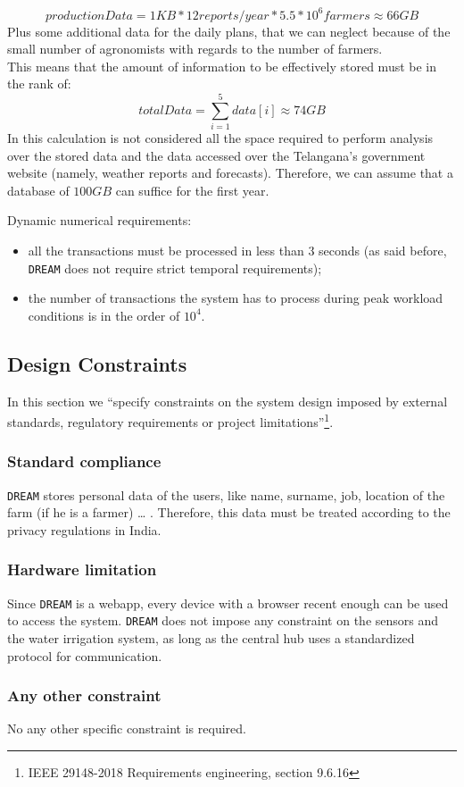 \documentclass{article}
\begin{document}
\begin{itemize}
\[productionData = 1 KB * 12 reports/year * 5.5 * 10^6 farmers \approx 66 GB \]
Plus some additional data for the daily plans, that we can neglect because of the small number of agronomists with regards to the number of farmers.\\
This means that the amount of information to be effectively stored must be in the rank of:
\[totalData = \sum_{i=1}^{5} data[i] \approx 74 GB \]
In this calculation is not considered all the space required to perform analysis over the stored data and the data accessed over the Telangana's government website (namely, weather reports and forecasts). Therefore, we can assume that a database of $100 GB$ can suffice for the first year.
\end{itemize}
Dynamic numerical requirements:
\begin{itemize}
\item all the transactions must be processed in less than 3 seconds (as said before, \verb|DREAM| does not require strict temporal requirements);
\item the number of transactions the system has to process during peak workload conditions is in the order of $10^4$.
\end{itemize}

\subsection{Design Constraints}
In this section we “specify constraints on the system design imposed by external standards, regulatory requirements or project limitations”\footnote{IEEE 29148-2018 Requirements engineering, section 9.6.16}.
\subsubsection{Standard compliance}
\verb|DREAM| stores personal data of the users, like name, surname, job, location of the farm (if he is a farmer) … . Therefore, this data must be treated according to the privacy regulations in India.
\subsubsection{Hardware limitation}
Since \verb|DREAM| is a webapp, every device with a browser recent enough can be used to access the system. \verb|DREAM| does not impose any constraint on the sensors and the water irrigation system, as long as the central hub uses a standardized protocol for communication.
\subsubsection{Any other constraint}
No any other specific constraint is required.
\end{document}
